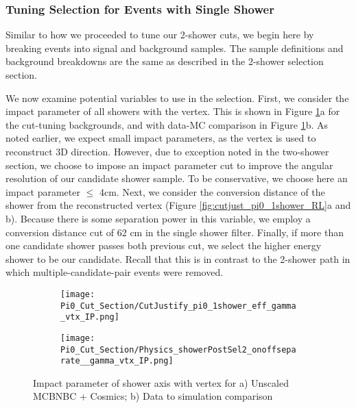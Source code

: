 \subsubsection{Tuning Selection for Events with Single Shower}

Similar to how we proceeded to tune our 2-shower cuts, we begin here by breaking events into signal and background samples.  The sample definitions and background breakdowns are the same as described in the 2-shower selection section.

\par We now examine potential variables to use in the selection.  First, we consider the impact parameter of all showers with the vertex.  This is shown in Figure \ref{fig:cutjust_pi0_1shower_IP}a for the cut-tuning backgrounds, and with data-MC comparison in Figure \ref{fig:cutjust_pi0_1shower_IP}b. As noted earlier, we expect small impact parameters, as the vertex is used to reconstruct 3D direction. However, due to exception noted in the two-shower section, we choose to impose an impact parameter cut to improve the angular resolution of our candidate shower sample. To be conservative, we choose here an impact parameter $\leq$ 4cm. Next, we consider the conversion distance of the shower from the reconstructed vertex (Figure \ref{fig:cutjust_pi0_1shower_RL}a and b). Because there is some separation power in this variable, we employ a conversion distance cut of 62 cm in the single shower filter. Finally, if more than one candidate shower passes both previous cut, we select the higher energy shower to be our candidate.  Recall that this is in contrast to the 2-shower path in which multiple-candidate-pair events were removed.

\begin{figure}[t!]
\centering
  \begin{subfigure}[t]{0.35\textwidth}
    \centering
\texttt{[image: Pi0\_Cut\_Section/CutJustify\_pi0\_1shower\_eff\_gamma\_vtx\_IP.png]}
  \caption{ }
  \end{subfigure} 
  \hspace{30mm}
  \begin{subfigure}[t]{0.35\textwidth}
    \centering
\texttt{[image: Pi0\_Cut\_Section/Physics\_showerPostSel2\_onoffseparate\_\_gamma\_vtx\_IP.png]}
  \caption{ }
  \end{subfigure} 
\caption{ Impact parameter of shower axis with vertex for a) Unscaled MCBNBC + Cosmics; b) Data to simulation comparison }
\label{fig:cutjust_pi0_1shower_IP}
\end{figure}

